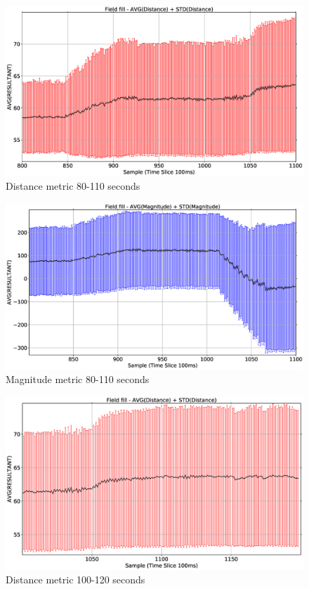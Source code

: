 \begin{figure}[H]
\begin{center}
\includegraphics[width=12cm]{CHAPTER-8/figures/FIELDFILL-DIST-3}
\end{center}
\caption{Distance metric 80-110 seconds\label{emerge:FIELDFILL-DIST-3}}
\end{figure}

\begin{figure}[H]
\begin{center}
\includegraphics[width=12cm]{CHAPTER-8/figures/FIELDFILL-MAG-3}
\end{center}
\caption{Magnitude metric 80-110 seconds\label{emerge:FIELDFILL-MAG-3}}
\end{figure}

\begin{figure}[H]
\begin{center}
\includegraphics[width=12cm]{CHAPTER-8/figures/FIELDFILL-DIST-3b}
\end{center}
\caption{Distance metric 100-120 seconds\label{emerge:FIELDFILL-DIST-3b}}
\end{figure}

